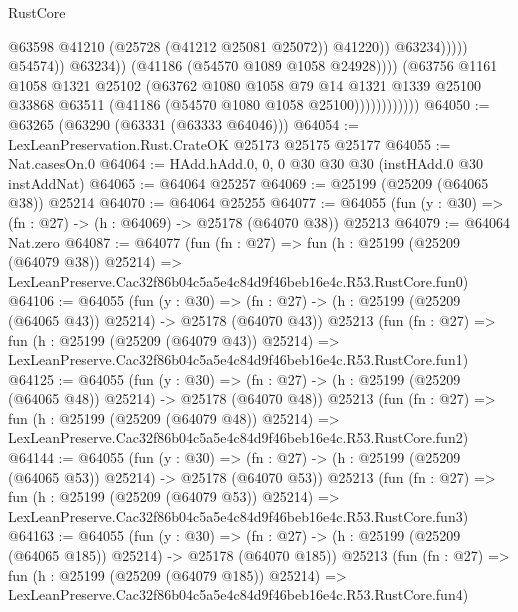 \begin{lexlean}{RustCore}
\begin{coremodule}
                                              @63598
                                              @41210
                                              (@25728 (@41212 @25081 @25072))
                                              @41220))
                                          @63234)))))
                                @54574))
                            @63234))
                        (@41186 (@54570 @1089 @1058 @24928))))
                    (@63756
                      @1161
                      @1058
                      @1321
                      @25102
                      (@63762
                        @1080
                        @1058
                        @79
                        @14
                        @1321
                        @1339
                        @25100
                        @33868
                        @63511
                        (@41186 (@54570 @1080 @1058 @25100))))))))))))
@64050 := @63265 (@63290 (@63331 (@63333 @64046)))
@64054 := LexLeanPreservation.Rust.CrateOK @25173 @25175 @25177
@64055 := Nat.casesOn.{0}
@64064 := HAdd.hAdd.{0, 0, 0} @30 @30 @30 (instHAdd.{0} @30 instAddNat)
@64065 := @64064 @25257
@64069 := @25199 (@25209 (@64065 @38)) @25214
@64070 := @64064 @25255
@64077 := @64055 (fun (y : @30) => (fn : @27) -> (h : @64069) -> @25178 (@64070 @38)) @25213
@64079 := @64064 Nat.zero
@64087 := @64077
    (fun (fn : @27) =>
    fun (h : @25199 (@25209 (@64079 @38)) @25214) =>
    LexLeanPreserve.Cac32f86b04c5a5e4c84d9f46beb16e4c.R53.RustCore.fun0)
@64106 := @64055
    (fun (y : @30) =>
    (fn : @27) -> (h : @25199 (@25209 (@64065 @43)) @25214) -> @25178 (@64070 @43))
    @25213
    (fun (fn : @27) =>
    fun (h : @25199 (@25209 (@64079 @43)) @25214) =>
    LexLeanPreserve.Cac32f86b04c5a5e4c84d9f46beb16e4c.R53.RustCore.fun1)
@64125 := @64055
    (fun (y : @30) =>
    (fn : @27) -> (h : @25199 (@25209 (@64065 @48)) @25214) -> @25178 (@64070 @48))
    @25213
    (fun (fn : @27) =>
    fun (h : @25199 (@25209 (@64079 @48)) @25214) =>
    LexLeanPreserve.Cac32f86b04c5a5e4c84d9f46beb16e4c.R53.RustCore.fun2)
@64144 := @64055
    (fun (y : @30) =>
    (fn : @27) -> (h : @25199 (@25209 (@64065 @53)) @25214) -> @25178 (@64070 @53))
    @25213
    (fun (fn : @27) =>
    fun (h : @25199 (@25209 (@64079 @53)) @25214) =>
    LexLeanPreserve.Cac32f86b04c5a5e4c84d9f46beb16e4c.R53.RustCore.fun3)
@64163 := @64055
    (fun (y : @30) =>
    (fn : @27) -> (h : @25199 (@25209 (@64065 @185)) @25214) -> @25178 (@64070 @185))
    @25213
    (fun (fn : @27) =>
    fun (h : @25199 (@25209 (@64079 @185)) @25214) =>
    LexLeanPreserve.Cac32f86b04c5a5e4c84d9f46beb16e4c.R53.RustCore.fun4)

\end{coremodule}
\end{lexlean}
